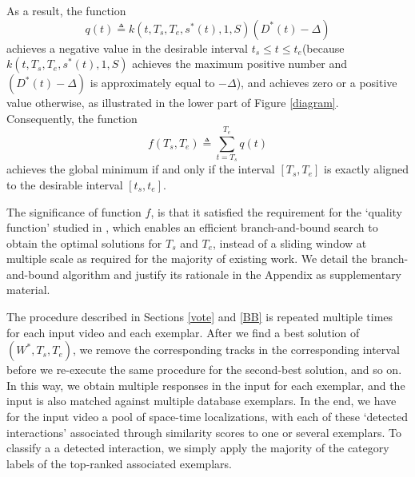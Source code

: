 As a result, the function
\begin{equation}
q(t)\triangleq k(t, T_{s},T_{e}, s^{*}(t), 1,S)(D^{*}(t)-\Delta)
\end{equation}
achieves a negative value in the desirable interval $t_{s}\le t\le t_{e}$(because $k(t, T_{s},T_{e}, s^{*}(t), 1,S)$ achieves the maximum positive number and $(D^{*}(t)-\Delta)$ is approximately equal to $-\Delta$), and achieves zero or a positive value otherwise, as illustrated in the lower part of Figure \ref{diagram}. Consequently, the function
\begin{equation}
\label{quality}
f(T_{s}, T_{e})\triangleq\sum^{T_{e}}_{t=T_{s}}q(t)
\end{equation}
achieves the global minimum if and only if the interval $[T_{s}, T_{e}]$ is exactly aligned to the desirable interval $[t_{s}, t_{e}]$. 

The significance of function $f$, is that it satisfied the requirement for the `quality function' studied in \cite{Lampert}, which enables an efficient branch-and-bound search to obtain the optimal solutions for $T_{s}$ and $T_{e}$, instead of a sliding window at multiple scale as required for the majority of existing work. We detail the branch-and-bound algorithm and justify its rationale in the Appendix as supplementary material.


The procedure described in Sections \ref{vote} and \ref{BB} is repeated multiple times for each input video and each exemplar. After we find a best solution of $(W^{*}, T_{s}, T_{e})$, we remove the corresponding tracks in the corresponding interval before we re-execute the same procedure for the second-best solution, and so on. In this way, we obtain multiple responses in the input for each exemplar, and  the input is also matched against multiple database exemplars. In the end, we have for the input video a pool of space-time localizations, with each of these `detected interactions' associated through similarity scores to one or several exemplars. To classify a a detected interaction, we simply apply the majority of the category labels of the top-ranked associated exemplars.

